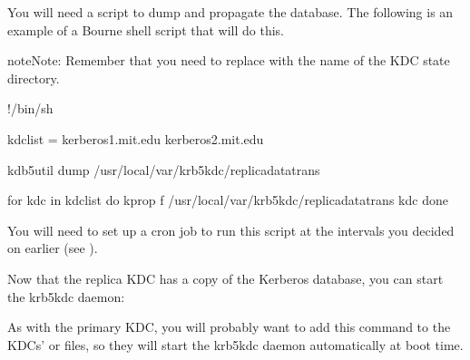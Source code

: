 \documentclass[letterpaper,10pt,english]{sphinxmanual}
\begin{document}
\sphinxAtStartPar
You will need a script to dump and propagate the database. The
following is an example of a Bourne shell script that will do this.

\begin{sphinxadmonition}{note}{Note:}
\sphinxAtStartPar
Remember that you need to replace 
with the name of the KDC state directory.
\end{sphinxadmonition}

\begin{sphinxVerbatim}[commandchars=\\\{\}]
\PYGZsh{}!/bin/sh

kdclist = \PYGZdq{}kerberos\PYGZhy{}1.mit.edu kerberos\PYGZhy{}2.mit.edu\PYGZdq{}

kdb5\PYGZus{}util dump /usr/local/var/krb5kdc/replica\PYGZus{}datatrans

for kdc in \PYGZdl{}kdclist
do
    kprop \PYGZhy{}f /usr/local/var/krb5kdc/replica\PYGZus{}datatrans \PYGZdl{}kdc
done
\end{sphinxVerbatim}

\sphinxAtStartPar
You will need to set up a cron job to run this script at the intervals
you decided on earlier (see {\hyperref[\detokenize{admin/realm_config:db-prop}]{}}).

\sphinxAtStartPar
Now that the replica KDC has a copy of the Kerberos database, you can
start the krb5kdc daemon:

\begin{sphinxVerbatim}[commandchars=\\\{\}]
 
\end{sphinxVerbatim}

\sphinxAtStartPar
As with the primary KDC, you will probably want to add this command to
the KDCs’  or  files, so they will start
the krb5kdc daemon automatically at boot time.
\end{document}

